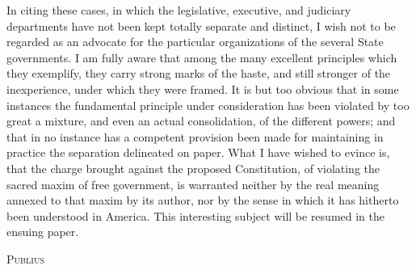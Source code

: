 In citing these cases, in which the legislative, executive, and judiciary departments have not been kept totally separate and distinct, I wish not to be regarded as an advocate for the particular organizations of the several State governments. I am fully aware that among the many excellent principles which they exemplify, they carry strong marks of the haste, and still stronger of the inexperience, under which they were framed. It is but too obvious that in some instances the fundamental principle under consideration has been violated by too great a mixture, and even an actual consolidation, of the different powers; and that in no instance has a competent provision been made for maintaining in practice the separation delineated on paper. What I have wished to evince is, that the charge brought against the proposed Constitution, of violating the sacred maxim of free government, is warranted neither by the real meaning annexed to that maxim by its author, nor by the sense in which it has hitherto been understood in America. This interesting subject will be resumed in the ensuing paper.

\vspace{.5cm}
\textsc{Publius}

\vspace{1.5cm}

